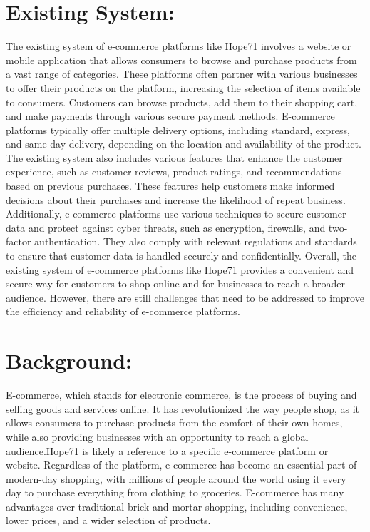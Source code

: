 \documentclass{article}
\begin{document}
\section{Existing System:}
The existing system of e-commerce platforms like Hope71 involves a website or mobile application that allows consumers to browse and purchase products from a vast range of categories. These platforms often partner with various businesses to offer their products on the platform, increasing the selection of items available to consumers. Customers can browse products, add them to their shopping cart, and make payments through various secure payment methods. E-commerce platforms typically offer multiple delivery options, including standard, express, and same-day delivery, depending on the location and availability of the product. The existing system also includes various features that enhance the customer experience, such as customer reviews, product ratings, and recommendations based on previous purchases. These features help customers make informed decisions about their purchases and increase the likelihood of repeat business. Additionally, e-commerce platforms use various techniques to secure customer data and protect against cyber threats, such as encryption, firewalls, and two-factor authentication. They also comply with relevant regulations and standards to ensure that customer data is handled securely and confidentially. Overall, the existing system of e-commerce platforms like Hope71 provides a convenient and secure way for customers to shop online and for businesses to reach a broader audience. However, there are still challenges that need to be addressed to improve the efficiency and reliability of e-commerce platforms.
\newpage
\section{Background:}
E-commerce, which stands for electronic commerce, is the process of buying and selling goods and services online. It has revolutionized the way people shop, as it allows consumers to purchase products from the comfort of their own homes, while also providing businesses with an opportunity to reach a global audience.Hope71 is likely a reference to a specific e-commerce platform or website. Regardless of the platform, e-commerce has become an essential part of modern-day shopping, with millions of people around the world using it every day to purchase everything from clothing to groceries. E-commerce has many advantages over traditional brick-and-mortar shopping, including convenience, lower prices, and a wider selection of products. 
\end{document}
